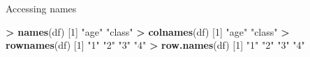 \documentclass[]{article}
\newenvironment{Shaded}{\begin{snugshade}}{\end{snugshade}}
\newcommand{\KeywordTok}[1]{\textcolor[rgb]{0.13,0.29,0.53}{\textbf{#1}}}
\newcommand{\DecValTok}[1]{\textcolor[rgb]{0.00,0.00,0.81}{#1}}
\newcommand{\StringTok}[1]{\textcolor[rgb]{0.31,0.60,0.02}{#1}}
\newcommand{\OperatorTok}[1]{\textcolor[rgb]{0.81,0.36,0.00}{\textbf{#1}}}
\newcommand{\NormalTok}[1]{#1}
\begin{document}
Accessing names

\begin{Shaded}
\begin{Highlighting}[]
\OperatorTok{>}\StringTok{ }\KeywordTok{names}\NormalTok{(df)}
\NormalTok{[}\DecValTok{1}\NormalTok{] }\StringTok{"age"}   \StringTok{"class"}
\OperatorTok{>}\StringTok{ }\KeywordTok{colnames}\NormalTok{(df)}
\NormalTok{[}\DecValTok{1}\NormalTok{] }\StringTok{"age"}   \StringTok{"class"}
\OperatorTok{>}\StringTok{ }\KeywordTok{rownames}\NormalTok{(df)}
\NormalTok{[}\DecValTok{1}\NormalTok{] }\StringTok{"1"} \StringTok{"2"} \StringTok{"3"} \StringTok{"4"}
\OperatorTok{>}\StringTok{ }\KeywordTok{row.names}\NormalTok{(df)}
\NormalTok{[}\DecValTok{1}\NormalTok{] }\StringTok{"1"} \StringTok{"2"} \StringTok{"3"} \StringTok{"4"}
\end{Highlighting}
\end{Shaded}
\end{document}
